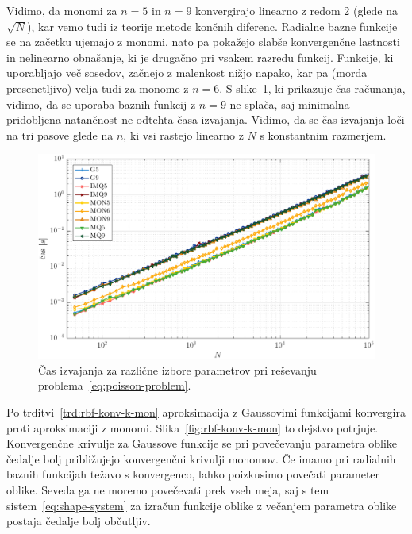 \documentclass[12pt,a4paper,twoside]{article}
\theoremstyle{definition} %
\theoremstyle{plain} %
\numberwithin{equation}{section}
\newlength{\iw}
\begin{document}
Vidimo, da monomi za $n=5$ in $n=9$ konvergirajo linearno z redom 2 (glede na $\sqrt{N}$), kar vemo
tudi iz teorije metode končnih diferenc. Radialne bazne funkcije se na začetku ujemajo z monomi,
nato pa pokažejo slabše konvergenčne lastnosti in nelinearno obnašanje, ki je drugačno pri vsakem razredu
funkcij. Funkcije, ki uporabljajo več sosedov, začnejo z malenkost nižjo napako, kar pa (morda
presenetljivo) velja tudi za monome z $n=6$. S slike~\ref{fig:poisson-square-time}, ki prikazuje čas
računanja, vidimo, da se uporaba baznih funkcij z $n = 9$ ne splača, saj minimalna pridobljena
natančnost ne odtehta časa izvajanja. Vidimo, da se čas izvajanja loči na tri pasove glede na $n$,
ki vsi rastejo linearno z $N$ s konstantnim razmerjem.

\begin{figure}[h]
  \centering
  \includegraphics[width=\iw]{images/poisson_square_time.pdf}
  \caption[Čas izvajanja MLSM pri reševanju Poissonove enačbe.]{Čas izvajanja za
  različne izbore parametrov pri reševanju
problema~\eqref{eq:poisson-problem}.}
  \label{fig:poisson-square-time}
\end{figure}

Po trditvi~\ref{trd:rbf-konv-k-mon} aproksimacija z Gaussovimi funkcijami konvergira proti
aproksimaciji z monomi. Slika~\ref{fig:rbf-konv-k-mon} to dejstvo potrjuje. Konvergenčne krivulje za
Gaussove funkcije se pri povečevanju parametra oblike čedalje bolj približujejo konvergenčni
krivulji monomov. Če imamo pri radialnih baznih funkcijah težavo s konvergenco, lahko poizkusimo
povečati parameter oblike. Seveda ga ne moremo povečevati prek vseh meja, saj s tem
sistem~\eqref{eq:shape-system} za izračun funkcije oblike z večanjem parametra oblike postaja
čedalje bolj občutljiv.
\end{document}
